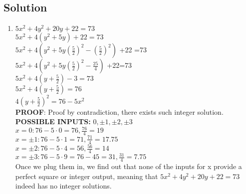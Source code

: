 \documentclass[11pt]{article}
\begin{document}
    \subsection*{Solution}
    \begin{enumerate}[label=(\alph*)]
        \item[] \(5x^2 +4y^2+20y+22=73\) \\
        \(5x^2 +4(y^2+5y)+22=73\) \\
        \(5x^2+4(y^2+5y(\frac{5}{2})^2-(\frac{5}{2})^2)\) +22 =73 \\
        \(5x^2+4(y^2+5y(\frac{5}{2})^2-\frac{25}{4})\) +22=73 \\
        \(5x^2+4(y+\frac{5}{2})-3=73\) \\
        \(5x^2+4(y+\frac{5}{2})=76\) \\
        \(4(y+\frac{5}{2})^2=76-5x^2\) \\
        \textbf{PROOF}: Proof by contradiction, there exists such integer solution. \\
        \textbf{POSSIBLE INPUTS:} \(0,\pm 1,\pm 2,\pm 3\) \\
        \(x = 0: 76 - 5 \cdot 0 = 76, \frac{76}{4} = 19\) \\
        \(x = \pm 1: 76 - 5 \cdot 1 = 71, \frac{71}{4} = 17.75\) \\
        \(x = \pm 2: 76 - 5 \cdot 4 = 56, \frac{56}{4} = 14\) \\
        \(x = \pm 3: 76 - 5 \cdot 9 = 76 - 45 = 31, \frac{31}{4} = 7.75\) \\
        Once we plug them in, we find out that none of the inputs for x provide a perfect square or integer output, meaning that \(5x^2 +4y^2+20y+22=73\) indeed has no integer solutions. \\
        
        
    \end{enumerate}
\end{document}
